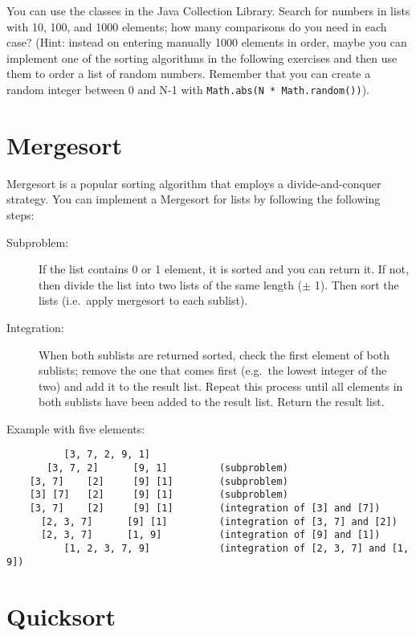 \documentclass{article}
\begin{document}
You
can use the classes in the Java Collection Library. Search for numbers
in lists with 10, 100, and 1000 elements; how many comparisons do you
need in each case? (Hint: instead on entering manually 1000 elements
in order, maybe you can implement one of the sorting algorithms in the
following exercises and then use them to order a list of random
numbers. Remember that you can create a random integer between 0 and
N-1 with \verb+Math.abs(N * Math.random())+).

\section{Mergesort}
\label{sec:mergesort}

Mergesort is a popular sorting algorithm that employs a
divide-and-conquer strategy. You can implement a Mergesort for lists
by following the following steps: 

\begin{description}
\item[Subproblem: ] If the list contains 0 or 1 element, it is sorted
  and you can return it. If not, then divide the list into two lists
  of the same length ($\pm$ 1). Then sort the lists (i.e.~apply
  mergesort to each sublist).
\item[Integration: ] When both sublists are returned sorted, check the
  first element of both sublists; remove the one that comes first
  (e.g.~the lowest integer of the two) and add it to the result
  list. Repeat this process until all elements in both sublists have
  been added to the result list. Return the result list. 
\end{description}

Example with five elements: 

\begin{verbatim}
          [3, 7, 2, 9, 1]            
       [3, 7, 2]      [9, 1]         (subproblem)
    [3, 7]    [2]     [9] [1]        (subproblem)
    [3] [7]   [2]     [9] [1]        (subproblem)
    [3, 7]    [2]     [9] [1]        (integration of [3] and [7])
      [2, 3, 7]      [9] [1]         (integration of [3, 7] and [2])
      [2, 3, 7]      [1, 9]          (integration of [9] and [1])
          [1, 2, 3, 7, 9]            (integration of [2, 3, 7] and [1, 9])
\end{verbatim}

\section{Quicksort}
\label{sec:quicksort}
\end{document}
